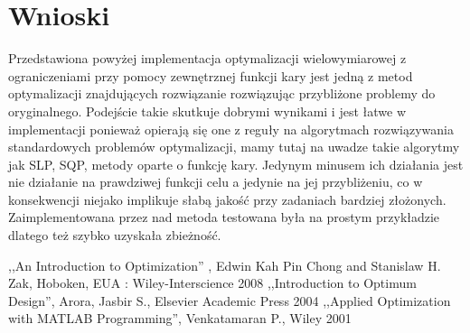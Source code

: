\documentclass{classrep}
\begin{document}
\section{Wnioski}
Przedstawiona powyżej implementacja optymalizacji wielowymiarowej z ograniczeniami przy pomocy zewnętrznej funkcji kary jest jedną z metod optymalizacji znajdujących rozwiązanie rozwiązując przybliżone problemy do oryginalnego. Podejście takie skutkuje dobrymi wynikami i jest łatwe w implementacji ponieważ opierają się one z reguły na algorytmach rozwiązywania standardowych problemów optymalizacji, mamy tutaj na uwadze takie algorytmy jak SLP, SQP, metody oparte o funkcję kary. Jedynym minusem ich działania jest nie działanie na prawdziwej funkcji celu a jedynie na jej przybliżeniu, co w konsekwencji niejako implikuje słabą jakość przy zadaniach bardziej złożonych. Zaimplementowana przez nad metoda testowana była na prostym przykładzie dlatego też szybko uzyskała zbieżność.

\begin{thebibliography}{9}
 ,,An Introduction to Optimization'' , Edwin Kah Pin Chong and Stanislaw H. Zak, Hoboken, EUA : Wiley-Interscience 2008
 ,,Introduction to Optimum Design'', Arora, Jasbir S., Elsevier Academic Press 2004
 ,,Applied Optimization with MATLAB Programming'', Venkatamaran P., Wiley 2001
\end{thebibliography}
\end{document}
